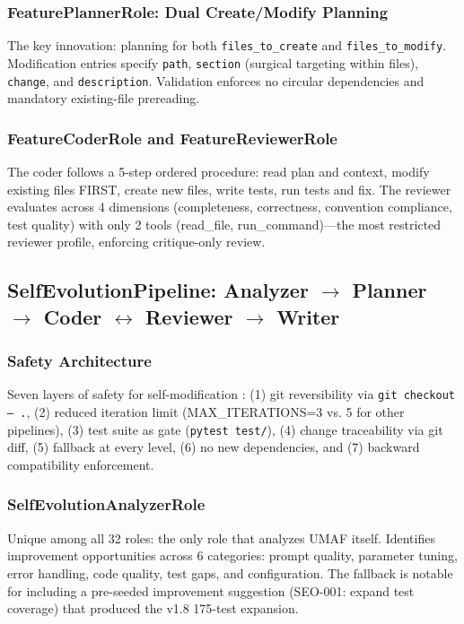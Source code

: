 \subsubsection{FeaturePlannerRole: Dual Create/Modify Planning}

The key innovation: planning for both \texttt{files\_to\_create} and \texttt{files\_to\_modify}. Modification entries specify \texttt{path}, \texttt{section} (surgical targeting within files), \texttt{change}, and \texttt{description}. Validation enforces no circular dependencies and mandatory existing-file prereading.

\subsubsection{FeatureCoderRole and FeatureReviewerRole}

The coder follows a 5-step ordered procedure: read plan and context, modify existing files FIRST, create new files, write tests, run tests and fix. The reviewer evaluates across 4 dimensions (completeness, correctness, convention compliance, test quality) with only 2 tools (read\_file, run\_command)---the most restricted reviewer profile, enforcing critique-only review.

\subsection{SelfEvolutionPipeline: Analyzer $\rightarrow$ Planner $\rightarrow$ Coder $\leftrightarrow$ Reviewer $\rightarrow$ Writer}

\subsubsection{Safety Architecture}

Seven layers of safety for self-modification \cite{reflectiondriven,caveagent}: (1) git reversibility via \texttt{git checkout -- .}, (2) reduced iteration limit (MAX\_ITERATIONS=3 vs. 5 for other pipelines), (3) test suite as gate (\texttt{pytest test/}), (4) change traceability via git diff, (5) fallback at every level, (6) no new dependencies, and (7) backward compatibility enforcement.

\subsubsection{SelfEvolutionAnalyzerRole}

Unique among all 32 roles: the only role that analyzes UMAF itself. Identifies improvement opportunities across 6 categories: prompt quality, parameter tuning, error handling, code quality, test gaps, and configuration. The fallback is notable for including a pre-seeded improvement suggestion (SEO-001: expand test coverage) that produced the v1.8 175-test expansion.

